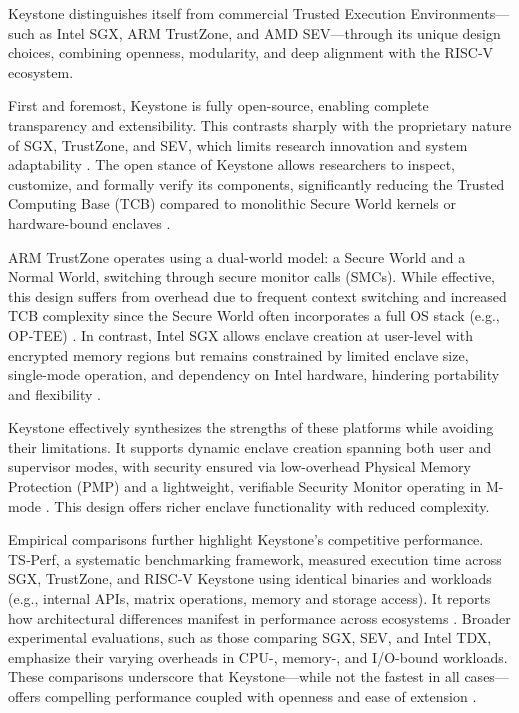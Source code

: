 Keystone distinguishes itself from commercial Trusted Execution Environments—such as Intel SGX, ARM TrustZone, and AMD SEV—through its unique design choices, combining openness, modularity, and deep alignment with the RISC‑V ecosystem.

First and foremost, Keystone is fully open-source, enabling complete transparency and extensibility. This contrasts sharply with the proprietary nature of SGX, TrustZone, and SEV, which limits research innovation and system adaptability \cite{turn0search0}. The open stance of Keystone allows researchers to inspect, customize, and formally verify its components, significantly reducing the Trusted Computing Base (TCB) compared to monolithic Secure World kernels or hardware-bound enclaves \cite{turn0search0}.

ARM TrustZone operates using a dual-world model: a Secure World and a Normal World, switching through secure monitor calls (SMCs). While effective, this design suffers from overhead due to frequent context switching and increased TCB complexity since the Secure World often incorporates a full OS stack (e.g., OP‑TEE) \cite{turn0search0}. In contrast, Intel SGX allows enclave creation at user-level with encrypted memory regions but remains constrained by limited enclave size, single-mode operation, and dependency on Intel hardware, hindering portability and flexibility \cite{turn0search0}.

Keystone effectively synthesizes the strengths of these platforms while avoiding their limitations. It supports dynamic enclave creation spanning both user and supervisor modes, with security ensured via low-overhead Physical Memory Protection (PMP) and a lightweight, verifiable Security Monitor operating in M-mode \cite{dayeol2019keystone}. This design offers richer enclave functionality with reduced complexity.

Empirical comparisons further highlight Keystone’s competitive performance. TS‑Perf, a systematic benchmarking framework, measured execution time across SGX, TrustZone, and RISC‑V Keystone using identical binaries and workloads (e.g., internal APIs, matrix operations, memory and storage access). It reports how architectural differences manifest in performance across ecosystems \cite{turn0search5}. Broader experimental evaluations, such as those comparing SGX, SEV, and Intel TDX, emphasize their varying overheads in CPU-, memory-, and I/O-bound workloads. These comparisons underscore that Keystone—while not the fastest in all cases—offers compelling performance coupled with openness and ease of extension \cite{turn0search2,turn0search10}.

